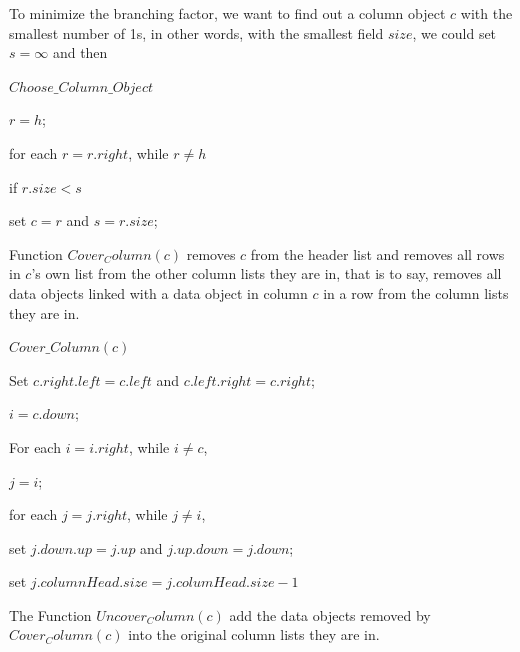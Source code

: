 \documentclass{mcmthesis}
\begin{document}
To minimize the branching factor, we want to find out a column object $c$ with the smallest number of 1s, in other words, with the smallest field $size$, we could set $s = \infty$ and then

\begin{framed}
\begin{list}{.}
{\setlength{\parsep}{0ex}\setlength{\itemsep}{0ex}}
\item[] $Choose\_Column\_Object$
\item[] $r = h$;
\item[] for each $r = r.right$, while $r \ne h$
\item[] \qquad if $r.size < s$
\item[] \qquad\qquad set $c = r$ and $s = r.size$;
\end{list}
\end{framed}

Function $Cover_Column(c)$ removes $c$ from the header list and removes all rows in $c$'s own list from the other column lists they are in, that is to say, removes all data objects linked with a data object in column $c$ in a row from the column lists they are in.

\begin{framed}
\begin{list}{.}
{\setlength{\parsep}{0ex}\setlength{\itemsep}{0ex}}
\item[] $Cover\_Column(c)$
\item[] Set $c.right.left = c.left$ and $c.left.right = c.right$;
\item[] $i = c.down$;
\item[] For each $i = i.right$, while $i \ne c$,
\item[] \qquad $j = i$;
\item[] \qquad for each $j = j.right$, while $j \ne i$,
\item[] \qquad\qquad set $j.down.up = j.up$ and $j.up.down = j.down$;
\item[] \qquad\qquad set $j.columnHead.size = j.columHead.size - 1$
\end{list}
\end{framed}

The Function $Uncover_Column(c)$ add the data objects removed by $Cover_Column(c)$ into the original column lists they are in.
\end{document}
